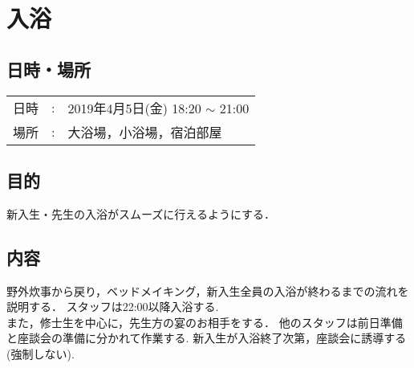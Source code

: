 %
\section{入浴}


\subsection{日時・場所}
\begin{tabular}{p{}rp{}}
  日時 & : & 2019年4月5日(金) 18:20 $\sim$ 21:00\\
  場所 & : & 大浴場，小浴場，宿泊部屋
\end{tabular}


\subsection{目的}
新入生・先生の入浴がスムーズに行えるようにする．

\subsection{内容}
野外炊事から戻り，ベッドメイキング，新入生全員の入浴が終わるまでの流れを説明する．
スタッフは22:00以降入浴する. \\
また，修士生を中心に，先生方の宴のお相手をする．
他のスタッフは前日準備と座談会の準備に分かれて作業する.
新入生が入浴終了次第，座談会に誘導する(強制しない).

